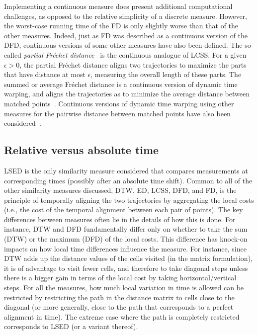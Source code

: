 \documentclass{interact}
\begin{document}
Implementing a continuous measure does present additional computational challenges, as opposed to the relative simplicity of a discrete measure. However, the worst-case running time of the FD is only slightly worse than that of the other measures. Indeed, just as FD was described as a continuous version of the DFD, continuous versions of some other measures have also been defined. The so-called \emph{partial Fr\'echet distance}~\citep{bbw-09} is the continuous analogue of LCSS. For a given $\epsilon >0$, the partial Fr\'echet distance aligns two trajectories to maximize the parts that have distance at most $\epsilon$, measuring the overall length of these parts. The summed or average Fr\'echet distance is a continuous version of dynamic time warping, and aligns the trajectories as to minimize the average distance between matched points~\citep{b-cfdts-07}. Continuous versions of dynamic time warping using other measures for the pairwise distance between matched points have also been considered~\citep{efrat2007curve}.


\subsection{Relative versus absolute time}
LSED is the only similarity measure considered that compares measurements at corresponding times (possibly after an absolute time shift). Common to all of the other similarity measures discussed, DTW, ED, LCSS, DFD, and FD, is the principle of temporally aligning the two trajectories by aggregating the local costs (i.e., the cost of the temporal alignment between each pair of points). The key differences between measures often lie in the details of how this is done. For instance, DTW and DFD fundamentally differ only on whether to take the sum (DTW) or the maximum (DFD) of the local costs. This difference has knock-on impacts on how local time differences influence the measure. For instance, since DTW adds up the distance values of the cells visited (in the matrix formulation), it is of advantage to visit fewer cells, and therefore to take diagonal steps unless there is a bigger gain in terms of the local cost by taking horizontal/vertical steps. For all the measures, how much local variation in time is allowed can be restricted by restricting the path in the distance matrix to cells close to the diagonal (or more generally, close to the path that corresponds to a perfect alignment in time). The extreme case where the path is completely restricted  corresponds to LSED (or a variant thereof).
\end{document}
